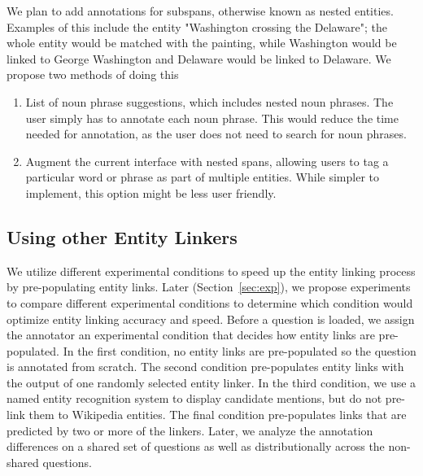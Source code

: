 We plan to add annotations for subspans, otherwise known as nested entities. 
Examples of this include the entity "Washington crossing the Delaware"; the whole entity would be matched with the painting, while Washington would be linked to George Washington and Delaware would be linked to Delaware. 
We propose two methods of doing this
\begin{enumerate}
	\item List of noun phrase suggestions, which includes nested noun phrases. 
	The user simply has to annotate each noun phrase. This would reduce the time needed for annotation, as the user does not need to search for noun phrases. 
	\item Augment the current interface with nested spans, allowing users to tag a particular word or phrase as part of multiple entities. 
	While simpler to implement, this option might be less user friendly. 
\end{enumerate}




\subsection{Using other Entity Linkers}
\label{sec:other-ent} 
We utilize different experimental conditions to speed up the entity linking process by pre-populating entity links. 
Later (Section~\ref{sec:exp}), we propose experiments to compare different experimental conditions to determine which condition would optimize entity linking accuracy and speed. 
Before a question is loaded, we assign the annotator an experimental condition that decides how entity links are pre-populated.
In the first condition, no entity links are pre-populated so the question is annotated from scratch.
The second condition pre-populates entity links with the output of one randomly selected entity linker. 
In the third condition, we use a named entity recognition system to display candidate mentions, but do not pre-link them to Wikipedia entities.
The final condition pre-populates links that are predicted by two or more of the linkers.
Later, we analyze the annotation differences on a shared set of questions as well as distributionally across the non-shared questions.

